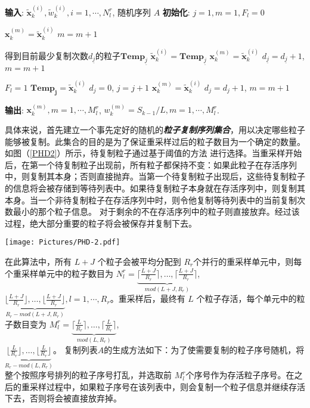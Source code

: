 \begin{algorithm}[htbp]

	\caption{改进的重采样算法}\label{alg:frame}
	\SetAlgoLined
	
	\textbf{输入}: $\tilde{\mathbf{x}}_k^{(i)},\tilde{w}_k^{(i)}, i=1,\cdots,N_l^r$, 随机序列 $A$\;
	\textbf{初始化}: $j=1, m=1, F_l=0$\;
	{
		{
			{
				{
				$\mathbf{x}_k^{(m)} = \tilde{\mathbf{x}}_k^{(i)}$\;
				$m = m+1$\;
				}
			}		
			{
				{
					得到目前最少复制次数$d_{\underline{j}}$的粒子$\mathbf{Temp}_{\underline{j}}$ \;
					$\tilde{\mathbf{x}}_k^{(i)} = \mathbf{Temp}_{\underline{j}}$\;
					$\mathbf{x}_k^{(m)} = \tilde{\mathbf{x}}_k^{(i)}$\;
					$d_{\underline{j}}=d_{\underline{j}}+1$, $m = m+1$\;
				}
	
			}
		}	
		{
			$F_l=1$\;
			$\mathbf{Temp_j}=\tilde{\mathbf{x}}_k^{(i)}$\;
			$d_j=0$, $j = j+1$\;
			{
				$\mathbf{x}_k^{(m)} = \tilde{\mathbf{x}}_k^{(i)}$\;
				$d_j = d_j+1$, $m = m + 1$\;
			}
		}
	}
	\textbf{输出}: $\mathbf{x}_k^{(m)}, m=1,\cdots,M_l^r$, $w_k^{(m)}=S_{k-1}/L, m= 1,\cdots,M_l^r$.\
\end{algorithm}

具体来说，首先建立一个事先定好的随机的\emph{\textbf{粒子复制序列集合}}，用以决定哪些粒子能够被复制。此集合的目的是为了保证重采样过后的粒子数目为一个确定的数量。 如图（\ref{PHD2}）所示，待复制粒子通过基于阈值的方法\cite{shi2013threshold} 进行选择。当重采样开始后，在第一个待复制粒子出现前，所有粒子都保持不变：如果此粒子在存活序列中，则复制其本身；否则直接抛弃。当第一个待复制粒子出现后，这些待复制粒子的信息将会被存储到等待列表中。如果待复制粒子本身就在存活序列中，则复制其本身。当一个非待复制粒子在存活序列中时，则令他复制等待列表中的当前复制次数最小的那个粒子信息。 对于剩余的不在存活序列中的粒子则直接放弃。经过该过程，绝大部分重要的粒子将会被保存并复制下去。

\begin{figure*}[htbp]
	\centering
	\texttt{[image: Pictures/PHD-2.pdf]}
	\caption{改进的重采样算法（\ref{alg:frame}）流程图}
	\label{PHD2}
\end{figure*}

在此算法中，所有 $L+J$ 个粒子会被平均分配到 $R_{r}$个并行的重采样单元中，则每个重采样单元中的粒子数目为  $N_l^r = \underbrace{\lceil\frac{L+J}{R_{r}} \rceil,\dots,\lceil\frac{L+J}{R_{r}} \rceil}_{mod(L+J,R_{r})}$, $\underbrace{\lfloor\frac{L+J}{R_{r}} \rfloor,\dots,\lfloor\frac{L+J}{R_{r}} \rfloor}_{R_{r}-mod(L+J,R_{r})}, l=1,\cdots,R_r$。重采样后，最终有 $L$ 个粒子存活，每个单元中的粒子数目变为 $M_l^r = \underbrace{\lceil\frac{L}{R_{r}} \rceil,\dots,\lceil\frac{L}{R_{r}} \rceil}_{mod(L,R_{r})}$, \\$\underbrace{\lfloor\frac{L}{R_{r}} \rfloor,\dots,\lfloor\frac{L}{R_{r}} \rfloor}_{R_{r}-mod(L,R_{r})}$。
复制列表$A$的生成方法如下：为了使需要复制的粒子序号随机，将整个按照序号排列的粒子序号打乱，并选取前 $M_l^r$个序号作为存活粒子序号。在之后的重采样过程中，如果粒子序号在该列表中，则会复制一个粒子信息并继续存活下去，否则将会被直接放弃掉。

